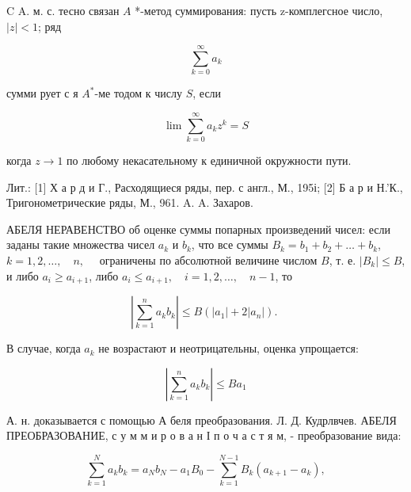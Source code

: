 \documentclass[10pt]{article}
\begin{document}
C A. м. с. тесно связан $A$ *-метод суммирования: пусть z-комплегсное число, $|z|<1$; ряд



\[

\sum_{k=0}^{\infty} a_{k}

\]



сумми рует с я $A^{*}$-ме тодом к числу $S$, если



\[

\lim \sum_{k=0}^{\infty} a_{k} z^{k}=S

\]



когда $z \rightarrow 1$ по любому некасательному к единичной окружности пути.



Лит.: [1] Х а р д и Г., Расходящиеся ряды, пер. с англ., М., 195і; [2] Б а р и Н.'К., Тригонометрические ряды, М., 961. A. A. Захаров.



АБЕЛЯ НЕРАВЕНСТВО об оценке суммы попарных произведений чисел: если заданы такие множества чисел $a_{k}$ и $b_{k}$, что все суммы $B_{k}=b_{1}+b_{2}+\ldots+b_{k}$, $k=1,2, \ldots, \quad n, \quad$ ограничены по абсолютной величине числом $B$, т. е. $\left|B_{k}\right| \leqslant B$, и либо $a_{i} \geqslant a_{i+1}$, либо $a_{i} \leqslant a_{i+1}, \quad i=1,2, \ldots, \quad n-1$, то



\[

\left|\sum_{k=1}^{n} a_{k} b_{k}\right| \leqslant B\left(\left|a_{1}\right|+2\left|a_{n}\right|\right) \text {. }

\]



В случае, когда $a_{k}$ не возрастают и неотрицательны, оценка упрощается:



\[

\left|\sum_{k=1}^{n} a_{k} b_{k}\right| \leqslant B a_{1}

\]



А. н. доказывается с помощью А беля преобразования. Л. Д. Кудрлвчев. АБЕЛЯ ПРЕОБРАЗОВАНИЕ, с у м м и р о в а н І п о ч а с т я м, - преобразование вида:



\[

\sum_{k=1}^{N} a_{k} b_{k}=a_{N} b_{N}-a_{1} B_{0}-\sum_{k=1}^{N-1} B_{k}\left(a_{k+1}-a_{k}\right),

\]
\end{document}
